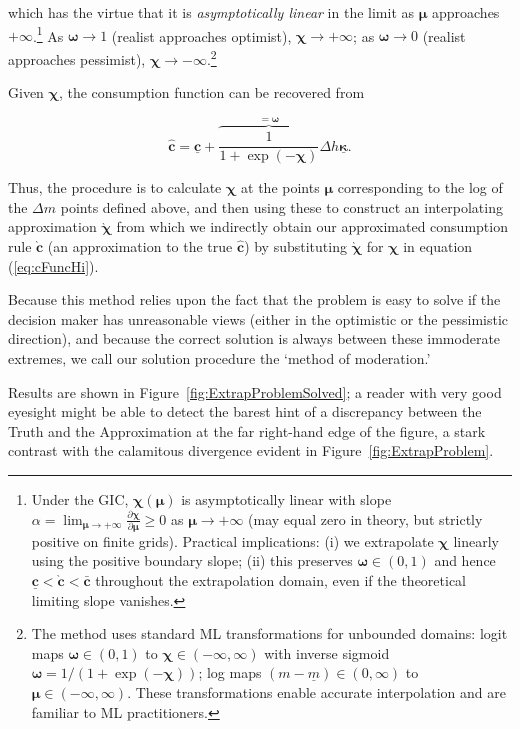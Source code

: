 \documentclass[preprint,authoryear]{elsarticle}
\newcommand{\mNrm}{m}
\newcommand{\cFunc}{\mathbf{c}}
\newcommand{\cFuncOpt}{\bar{\cFunc}}
\newcommand{\cFuncApprox}{\grave{\cFunc}}
\newcommand{\hNrm}{h}
\newcommand{\MPC}{\boldsymbol{\kappa}}
\newcommand{\MPCmin}{\underline{\MPC}}
\newcommand{\mNrmMin}{\underline{\mNrm}}
\newcommand{\logmNrmEx}{\boldsymbol{\mu}}
\newcommand{\modRte}{\boldsymbol{\omega}}
\newcommand{\mNrmEx}{\Delta \mNrm}
\newcommand{\hNrmEx}{\Delta \hNrm}
\newcommand{\cFuncPes}{\underline{\cFunc}}
\newcommand{\cFuncReal}{\hat{\cFunc}}
\newcommand{\logitModRte}{\boldsymbol{\chi}}
\newcommand{\asympSlope}{\alpha}
\newcommand{\logitModRteApprox}{\grave{\logitModRte}}
\begin{document}
which has the virtue that it is \textit{asymptotically linear} in the limit as
$\logmNrmEx$ approaches $+\infty$.\footnote{Under the GIC, $\logitModRte(\logmNrmEx)$ is asymptotically linear with slope $\asympSlope = \lim_{\logmNrmEx \to +\infty} \frac{\partial \logitModRte}{\partial \logmNrmEx} \geq 0$ as $\logmNrmEx \to +\infty$ (may equal zero in theory, but strictly positive on finite grids). Practical implications: (i) we extrapolate $\logitModRte$ linearly using the positive boundary slope; (ii) this preserves $\modRte\in(0,1)$ and hence $\cFuncPes < \cFuncApprox < \cFuncOpt$ throughout the extrapolation domain, even if the theoretical limiting slope vanishes.} As
$\modRte \to 1$ (realist approaches optimist), $\logitModRte \to +\infty$;
as $\modRte \to 0$ (realist approaches pessimist), $\logitModRte \to -\infty$.\footnote{The method uses standard ML transformations for unbounded domains: logit maps $\modRte \in (0,1)$ to $\logitModRte \in ( -\infty, \infty)$ with inverse sigmoid $\modRte = 1/(1+\exp( -\logitModRte))$; log maps $(\mNrm - \mNrmMin) \in (0, \infty)$ to $\logmNrmEx \in ( -\infty, \infty)$. These transformations enable accurate interpolation and are familiar to ML practitioners.}

Given $\logitModRte$, the consumption function can be recovered from

\begin{equation}
\label{eq:cFuncHi}
\cFuncReal = \cFuncPes+\overbrace{\frac{1}{1+\exp(-\logitModRte)}}^{=\modRte} \hNrmEx \MPCmin.
\end{equation}

Thus, the procedure is to calculate $\logitModRte$ at the points
$\logmNrmEx$ corresponding to the log of the $\mNrmEx$ points
defined above, and then using these to construct an interpolating approximation
$\logitModRteApprox$ from which we indirectly obtain our approximated
consumption rule $\cFuncApprox$ (an approximation to the true $\cFuncReal$) by substituting $\logitModRteApprox$ for
$\logitModRte$ in equation (\ref{eq:cFuncHi}).

Because this method relies upon the fact that the problem is easy to solve if
the decision maker has unreasonable views (either in the optimistic or the
pessimistic direction), and because the correct solution is always between these
immoderate extremes, we call our solution procedure the `method of moderation.'

Results are shown in Figure~\ref{fig:ExtrapProblemSolved}; a reader with very good
eyesight might be able to detect the barest hint of a discrepancy between the
Truth and the Approximation at the far right-hand edge of the figure, a stark
contrast with the calamitous divergence evident in Figure~\ref{fig:ExtrapProblem}.
\end{document}
